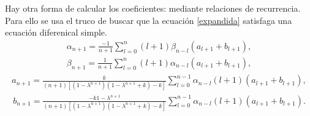 \documentclass[11pt]{beamer}
\theoremstyle{definition}
\begin{document}
\begin{frame}

Hay otra forma de calcular los coeficientes: mediante relaciones de recurrencia. Para ello se usa el truco de buscar que la ecuación \eqref{expandida} satisfaga una ecuación diferenical simple.
\begin{eqnarray}
\alpha_{n+1}=\frac{-1}{n+1}\sum_{l=0}^{n}(l+1)\beta_{n-l}(a_{l+1}+b_{l+1}),
\label{recurrencia alpha}
\end{eqnarray}
\begin{eqnarray}
\beta_{n+1}=\frac{1}{n+1}\sum_{l=0}^{n}(l+1)\alpha_{n-l}(a_{l+1}+b_{l+1}),
\label{recurrencia beta}
\end{eqnarray}
\begin{eqnarray}
a_{n+1}=\frac{k}{(n+1)[(1-\lambda^{n+1})(1-\lambda^{n+1}+k)-k]}\sum_{l=0}^{n-1}\alpha_{n-l}(l+1)(a_{l+1}+b_{l+1}),
\end{eqnarray}
\begin{eqnarray}
b_{n+1}=\frac{-k 1-\lambda^{n+1}}{(n+1)[(1-\lambda^{n+1})(1-\lambda^{n+1}+k)-k]}\sum_{l=0}^{n-1}\alpha_{n-l}(l+1)(a_{l+1}+b_{l+1}).
\end{eqnarray}
\end{frame}


\end{document}
